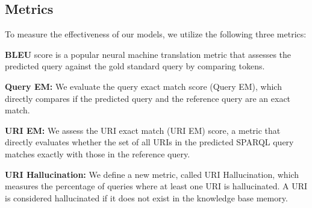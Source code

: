 
\subsection{Metrics}
\label{sec:metrics}

To measure the effectiveness of our models, we utilize the following three metrics: 

\noindent \textbf{BLEU} score \citep{bleu} is a popular neural machine translation metric that assesses the predicted query against the gold standard query by comparing tokens. 

\noindent \textbf{Query EM:} We evaluate the query exact match score (Query EM), which directly compares if the predicted query and the reference query are an exact match. 

\noindent \textbf{URI EM:} We assess the URI exact match (URI EM) score, a metric that directly evaluates whether the set of all URIs in the predicted SPARQL query matches exactly with those in the reference query.

\noindent \textbf{URI Hallucination:}  We define a new metric, called URI Hallucination, which measures the percentage of queries where at least one URI is hallucinated. A URI is considered hallucinated if it does not exist in the knowledge base memory.



